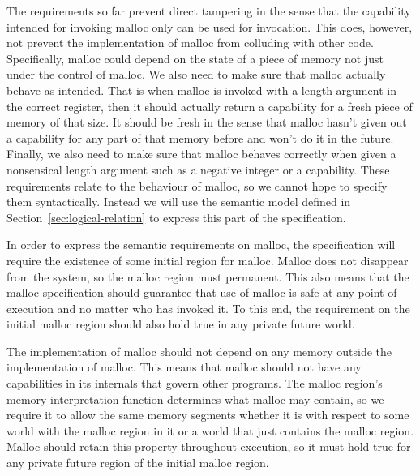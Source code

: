 \documentclass[format=acmsmall, review=false, screen=true]{acmart}
\newenvironment{toplas}
    {\color{OliveGreen}
          
    }{}
\begin{document}
\begin{toplas}
The requirements so far prevent direct tampering in the sense that the
capability intended for invoking malloc only can be used for invocation. This
does, however, not prevent the implementation of malloc from colluding with
other code. Specifically, malloc could depend on the state of a piece of memory
not just under the control of malloc. We also need to make sure that malloc
actually behave as intended. That is when malloc is invoked with a length
argument in the correct register, then it should actually return a capability
for a fresh piece of memory of that size. It should be fresh in the sense that
malloc hasn't given out a capability for any part of that memory before and
won't do it in the future. Finally, we also need to make sure that malloc
behaves correctly when given a nonsensical length argument such as a negative
integer or a capability. These requirements relate to the behaviour of malloc,
so we cannot hope to specify them syntactically. Instead we will use the
semantic model defined in  Section~\ref{sec:logical-relation} to express this
part of the specification. 

In order to express the semantic requirements on malloc, the specification will
require the existence of some initial region for malloc. Malloc does not
disappear from the system, so the malloc region must permanent. This also means
that the malloc specification should guarantee that use of malloc is safe at any
point of execution and no matter who has invoked it. To this end, the
requirement on the initial malloc region should also hold true in any private
future world.

The implementation of malloc should not depend on any memory outside the
implementation of malloc. This means that malloc should not have any
capabilities in its internals that govern other programs. The malloc region's
memory interpretation function determines what malloc may contain, so we require
it to allow the same memory segments whether it is with respect to some world
with the malloc region in it or a world that just contains the malloc region.
Malloc should retain this property throughout execution, so it must hold true
for any private future region of the initial malloc region.


\end{toplas}
\end{document}
